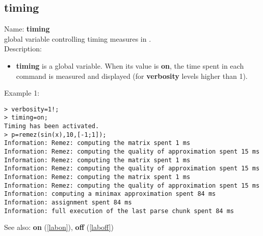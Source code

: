 \subsection{timing}
\label{labtiming}
\noindent Name: \textbf{timing}\\
global variable controlling timing measures in \sollya.\\

\noindent Description: \begin{itemize}

\item \textbf{timing} is a global variable. When its value is \textbf{on}, the time spent in each 
   command is measured and displayed (for \textbf{verbosity} levels higher than 1).
\end{itemize}
\noindent Example 1: 
\begin{center}\begin{minipage}{15cm}\begin{Verbatim}[frame=single]
> verbosity=1!;
> timing=on;
Timing has been activated.
> p=remez(sin(x),10,[-1;1]);
Information: Remez: computing the matrix spent 1 ms
Information: Remez: computing the quality of approximation spent 15 ms
Information: Remez: computing the matrix spent 1 ms
Information: Remez: computing the quality of approximation spent 15 ms
Information: Remez: computing the matrix spent 1 ms
Information: Remez: computing the quality of approximation spent 15 ms
Information: computing a minimax approximation spent 84 ms
Information: assignment spent 84 ms
Information: full execution of the last parse chunk spent 84 ms
\end{Verbatim}
\end{minipage}\end{center}
See also: \textbf{on} (\ref{labon}), \textbf{off} (\ref{laboff})
